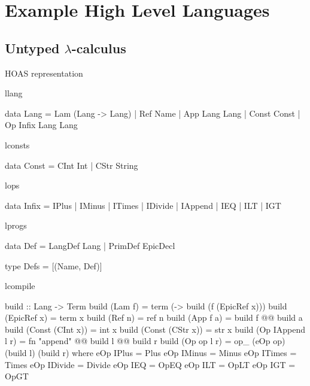 \section{Example High Level Languages}

\subsection{Untyped $\lambda$-calculus}

HOAS representation

\begin{SaveVerbatim}{llang}

data Lang = Lam (Lang -> Lang)
          | Ref Name
          | App Lang Lang
          | Const Const
          | Op Infix Lang Lang

\end{SaveVerbatim}

\begin{SaveVerbatim}{lconsts}

data Const = CInt Int
           | CStr String

\end{SaveVerbatim}

\begin{SaveVerbatim}{lops}

data Infix = IPlus | IMinus | ITimes | IDivide | IAppend
           | IEQ | ILT | IGT

\end{SaveVerbatim}

\begin{SaveVerbatim}{lprogs}

data Def = LangDef Lang
         | PrimDef EpicDecl

type Defs = [(Name, Def)]

\end{SaveVerbatim}

\begin{SaveVerbatim}{lcompile}

build :: Lang -> Term
build (Lam f)          = term (\x -> build (f (EpicRef x)))
build (EpicRef x)      = term x
build (Ref n)          = ref n
build (App f a)        = build f @@ build a
build (Const (CInt x)) = int x
build (Const (CStr x)) = str x
build (Op IAppend l r) = fn "append" @@ build l @@ build r
build (Op op l r)      = op_ (eOp op) (build l) (build r)
    where eOp IPlus   = Plus
          eOp IMinus  = Minus
          eOp ITimes  = Times
          eOp IDivide = Divide
          eOp IEQ     = OpEQ
          eOp ILT     = OpLT
          eOp IGT     = OpGT

\end{SaveVerbatim}

